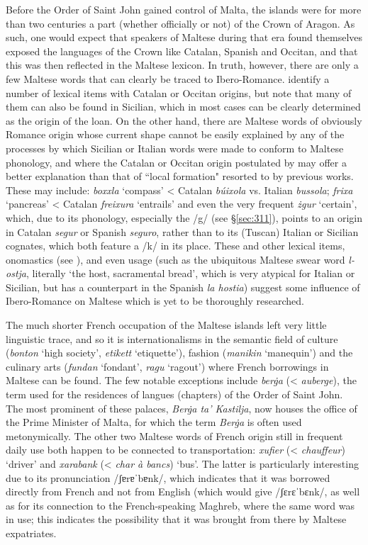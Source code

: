 \documentclass[output=paper]{langsci/langscibook}
\begin{document}
Before the Order of Saint John gained control of Malta, the islands were for more than two centuries a part (whether officially or not) of the Crown of Aragon. As such, one would expect that speakers of Maltese during that era found themselves exposed the languages of the Crown like Catalan, Spanish and Occitan, and that this was then reflected in the Maltese lexicon. In truth, however, there are only a few Maltese words that can clearly be traced to Ibero-Romance. \cite{catalan2017} identify a number of lexical items with Catalan or Occitan origins, but note that many of them can also be found in Sicilian, which in most cases can be clearly determined as the origin of the loan. On the other hand, there are Maltese words of obviously Romance origin whose current shape cannot be easily explained by any of the processes by which Sicilian or Italian words were made to conform to Maltese phonology, and where the Catalan or Occitan origin postulated by \cite{catalan2017} may offer a better explanation than that of ``local formation" resorted to by previous works. These may include: \textit{boxxla} `compass' < Catalan \textit{búixola} vs. Italian \textit{bussola}; \textit{frixa} `pancreas' < Catalan \textit{freixura} `entrails' and even the very frequent \textit{żgur} `certain', which, due to its phonology, especially the /g/ (see §\ref{sec:311}), points to an origin in Catalan \textit{segur} or Spanish \textit{seguro}, rather than to its (Tuscan) Italian or Sicilian cognates, which both feature a /k/ in its place. These and other lexical items, onomastics (see \citealt[46]{catalan2017}), and even usage (such as the ubiquitous Maltese swear word \textit{l-ostja}, literally `the host, sacramental bread', which is very atypical for Italian or Sicilian, but has a counterpart in the Spanish \textit{la hostia}) suggest some influence of Ibero-Romance on Maltese which is yet to be thoroughly researched.

The much shorter French occupation of the Maltese islands left very little linguistic trace, and so it is internationalisms in the semantic field of culture (\textit{bonton} `high society', \textit{etikett} `etiquette'), fashion (\textit{manikin} `manequin') and the culinary arts (\textit{fundan} `fondant', \textit{ragu} `ragout') where French borrowings in Maltese can be found. The few notable exceptions include \textit{berġa} (< \textit{auberge}), the term used for the residences of langues (chapters) of the Order of Saint John. The most prominent of these palaces, \textit{Berġa ta' Kastilja}, now houses the office of the Prime Minister of Malta, for which the term \textit{Berġa} is often used metonymically. The other two Maltese words of French origin still in frequent daily use both happen to be connected to transportation: \textit{xufier} (< \textit{chauffeur}) `driver' and \textit{xarabank} (< \textit{char à bancs}) `bus'. The latter is particularly interesting due to its pronunciation /ʃɐrɐˈbɐnk/, which indicates that it was borrowed directly from French and not from English (which would give /ʃɛrɛˈbɛnk/, as well as for its connection to the French-speaking Maghreb, where the same word was in use; this indicates the possibility that it was brought from there by Maltese expatriates.
\end{document}
